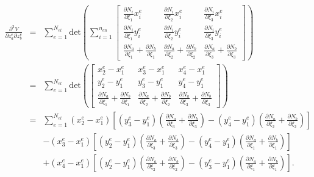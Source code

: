 \documentclass[12pt,aps,pre]{revtex4}
\begin{document}
\begin{eqnarray}
\frac{\partial^2 V}{\partial z_a^e \partial z_b^e} &=& \sum_{e=1}^{N_{el}} \text{det}\left(\sum_{i=1}^{n_{en}} \begin{bmatrix}
\frac{\partial N_i}{\partial \xi_1}x_i^e  & \frac{\partial N_i}{\partial \xi_2}x_i^e  & \frac{\partial N_i}{\partial \xi_3}x_i^e \\
%
\frac{\partial N_i}{\partial \xi_1}y_i^e & \frac{\partial N_i}{\partial \xi_2}y_i^e & \frac{\partial N_i}{\partial \xi_3}y_i^e \\
%
\frac{\partial N_a}{\partial \xi_1}+\frac{\partial N_b}{\partial \xi_1}  & \frac{\partial N_a}{\partial \xi_2}+\frac{\partial N_b}{\partial \xi_2}  & \frac{\partial N_a}{\partial \xi_3}+\frac{\partial N_b}{\partial \xi_3} 
\end{bmatrix}\right) \nonumber\\
&=& \sum_{e=1}^{N_{el}} \text{det}\left( \begin{bmatrix}
x_2^e - x_1^e & x_3^e - x_1^e & x_4^e - x_1^e \\
%
y_2^e - y_1^e & y_3^e - y_1^e & y_4^e - y_1^e \\
%
\frac{\partial N_a}{\partial \xi_1}+\frac{\partial N_b}{\partial \xi_1}  & \frac{\partial N_a}{\partial \xi_2}+\frac{\partial N_b}{\partial \xi_2}  & \frac{\partial N_a}{\partial \xi_3}+\frac{\partial N_b}{\partial \xi_3} 
\end{bmatrix}\right) \nonumber\\
%
&=&\sum_{e=1}^{N_{el}}(x_2^e - x_1^e)\left[(y_3^e - y_1^e)\left(\frac{\partial N_a}{\partial \xi_3}+\frac{\partial N_b}{\partial \xi_3}\right)-(y_4^e - y_1^e)\left(\frac{\partial N_a}{\partial \xi_2}+\frac{\partial N_b}{\partial \xi_2}\right)\right] \nonumber\\
%
&&-(x_3^e - x_1^e)\left[(y_2^e - y_1^e)\left(\frac{\partial N_a}{\partial \xi_3}+\frac{\partial N_b}{\partial \xi_3}\right)-(y_4^e - y_1^e)\left(\frac{\partial N_a}{\partial \xi_1}+\frac{\partial N_b}{\partial \xi_1}\right)\right] \nonumber\\
%
&&+(x_4^e - x_1^e)\left[(y_2^e - y_1^e)\left(\frac{\partial N_a}{\partial \xi_2}+\frac{\partial N_b}{\partial \xi_2}\right)-(y_3^e - y_1^e)\left(\frac{\partial N_a}{\partial \xi_1}+\frac{\partial N_b}{\partial \xi_1}\right)\right].
\end{eqnarray}
\end{document}
